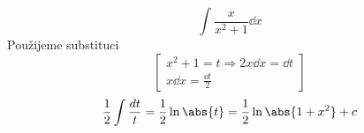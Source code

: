 \begin{mdframed}[style=mdexam]
  \begin{example}\label{mai:exam123}
    \begin{equation*}
      \int\frac{x}{x^2+1}\dd{x}
    \end{equation*}
    Použijeme substituci
    \begin{equation*}
      \left[
        \begin{array}{c} 
          x^2 + 1 = t  \Rightarrow 2x\dd{x} = \dd{t}        \\ 
              x\dd{x} = \displaystyle{\frac{\dd{t}}{2}}
        \end{array} 
      \right]        
    \end{equation*}
    \begin{equation*}
      \frac{1}{2}\int\frac{dt}{t} = \frac{1}{2}\ln\abs{t} =\frac{1}{2}\ln\abs{1+x^2}+ c
    \end{equation*}
  \end{example}
\end{mdframed}